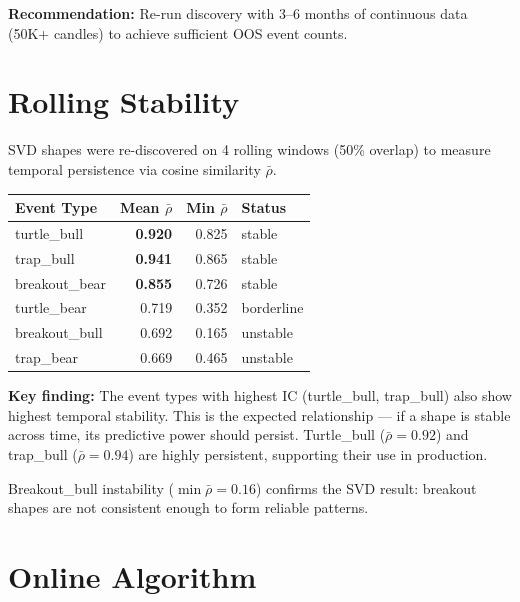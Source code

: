 \documentclass[11pt,a4paper]{article}
\begin{document}
\textbf{Recommendation:} Re-run discovery with 3--6 months of
continuous data (50K+ candles) to achieve sufficient OOS event counts.

\section{Rolling Stability}

SVD shapes were re-discovered on 4 rolling windows (50\% overlap) to measure
temporal persistence via cosine similarity $\bar{\rho}$.

\begin{center}
\begin{tabular}{lrrl}
\hline
\textbf{Event Type} & \textbf{Mean $\bar{\rho}$} & \textbf{Min $\bar{\rho}$} & \textbf{Status} \\
\hline
turtle\_bull    & \textbf{0.920} & 0.825 & stable     \\
trap\_bull      & \textbf{0.941} & 0.865 & stable     \\
breakout\_bear  & \textbf{0.855} & 0.726 & stable     \\
turtle\_bear    & 0.719          & 0.352 & borderline \\
breakout\_bull  & 0.692          & 0.165 & unstable   \\
trap\_bear      & 0.669          & 0.465 & unstable   \\
\hline
\end{tabular}
\end{center}

\textbf{Key finding:} The event types with highest IC (turtle\_bull,
trap\_bull) also show highest temporal stability.  This is the expected
relationship --- if a shape is stable across time, its predictive power should
persist.  Turtle\_bull ($\bar{\rho} = 0.92$) and trap\_bull
($\bar{\rho} = 0.94$) are highly persistent, supporting their use in
production.

Breakout\_bull instability ($\min \bar{\rho} = 0.16$) confirms the SVD result:
breakout shapes are not consistent enough to form reliable patterns.

\section{Online Algorithm}
\end{document}
